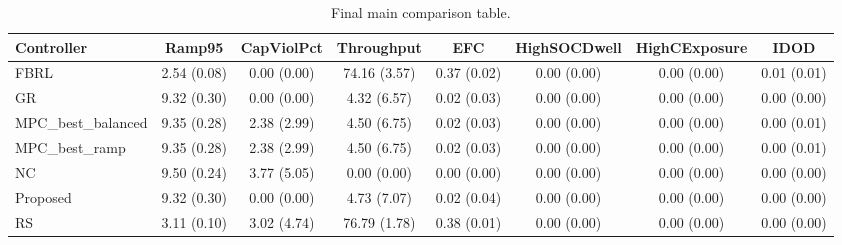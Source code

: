 \begin{table}[t]
\centering
\caption{Final main comparison table.}
\label{tab:results_final_auto}
\begin{tabular}{lccccccc}
\toprule
Controller & Ramp95 & CapViolPct & Throughput & EFC & HighSOCDwell & HighCExposure & IDOD \\
\midrule
FBRL & 2.54 (0.08) & 0.00 (0.00) & 74.16 (3.57) & 0.37 (0.02) & 0.00 (0.00) & 0.00 (0.00) & 0.01 (0.01) \\
GR & 9.32 (0.30) & 0.00 (0.00) & 4.32 (6.57) & 0.02 (0.03) & 0.00 (0.00) & 0.00 (0.00) & 0.00 (0.00) \\
MPC\_best\_balanced & 9.35 (0.28) & 2.38 (2.99) & 4.50 (6.75) & 0.02 (0.03) & 0.00 (0.00) & 0.00 (0.00) & 0.00 (0.01) \\
MPC\_best\_ramp & 9.35 (0.28) & 2.38 (2.99) & 4.50 (6.75) & 0.02 (0.03) & 0.00 (0.00) & 0.00 (0.00) & 0.00 (0.01) \\
NC & 9.50 (0.24) & 3.77 (5.05) & 0.00 (0.00) & 0.00 (0.00) & 0.00 (0.00) & 0.00 (0.00) & 0.00 (0.00) \\
Proposed & 9.32 (0.30) & 0.00 (0.00) & 4.73 (7.07) & 0.02 (0.04) & 0.00 (0.00) & 0.00 (0.00) & 0.00 (0.00) \\
RS & 3.11 (0.10) & 3.02 (4.74) & 76.79 (1.78) & 0.38 (0.01) & 0.00 (0.00) & 0.00 (0.00) & 0.00 (0.00) \\
\bottomrule
\end{tabular}
\end{table}